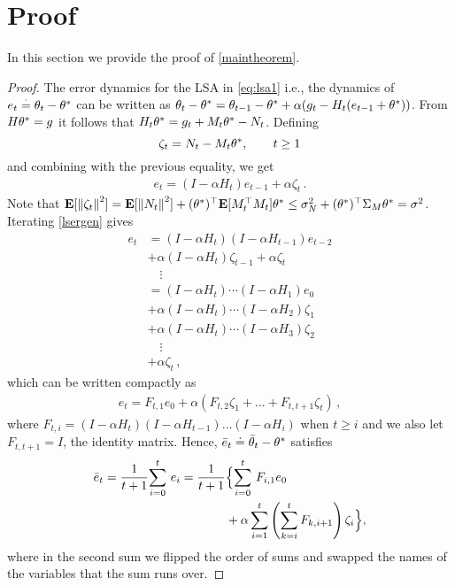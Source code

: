 \section{Proof}
\label{sec:proof}
In this section we provide the proof of \cref{maintheorem}.
\begin{proof}
The error dynamics for the LSA in \eqref{eq:lsa1} i.e., the dynamics of $e_t\eqdef\theta_t-\ts$ can be written as
$\theta_t-\ts=\theta_{t-1}-\ts+\alpha(g_t -H_t(e_{t-1}+\ts))$.
From $H\ts=g$ it follows that $H_t\theta^* = g_t + M_t\ts - N_t$. Defining
\[
\zeta_t = N_t - M_t \ts, \qquad t\ge 1
\]
and combining with the previous equality, we get
\begin{align}\label{lsergen}
e_t=(I-\alpha H_t)e_{t-1}+\alpha \zeta_t\,.
\end{align}
Note that
$
\EE{ \norm{\zeta_t}^2 }
= \EE{ \norm{N_t}^2 } + (\ts)^\top \EE{ M_t^\top M_t }\ts \le \sigma_N^2 + (\ts)^\top \Sigma_M \ts
= \sigma^2
$.
Iterating \eqref{lsergen}  gives
\begin{align*}
e_t
& = (I-\alpha H_t) (I-\alpha H_{t-1}) e_{t-2}\\ &+ \alpha (I-\alpha H_t) \zeta_{t-1} +\alpha \zeta_t \\
& \quad \vdots\\
& = (I-\alpha H_t) \cdots (I-\alpha H_1) e_0\\ &+ \alpha (I-\alpha H_t) \cdots (I-\alpha H_2) \zeta_1 \\
& + \alpha (I-\alpha H_t) \cdots (I-\alpha H_3) \zeta_2\\
&  \quad \vdots \\
&+ \alpha \zeta_t\,,
\end{align*}
which can be written compactly as
\begin{align}
\label{eq:etft}
e_t = F_{t,1} e_0 + \alpha (F_{t,2} \zeta_1 + \dots + F_{t,t+1} \zeta_t )\,,
\end{align}
where $F_{t,i} = (I-\alpha H_t) (I-\alpha H_{t-1}) \dots (I-\alpha H_i)$ when $t\ge i$ and we also let $F_{t,t+1}=I$, the identity matrix.
Hence, $\eb_t \doteq \tb_t-\ts$ satisfies
\begin{align*}
\eb_t=\frac{1}{t+1}\ous{\sum}{i=0}{t}e_i
=\frac{1}{t+1}&\Big\{\ous{\sum}{i=0}{t} F_{i,1} e_0 \\
&+ \alpha \sum_{i=1}^{t} \left(\sum_{k=i}^{t} F_{k,i+1} \right)\zeta_i \Big\} ,
\end{align*}
where in the second sum we flipped the order of sums and swapped the names of the variables that the sum runs over.


\end{proof}
